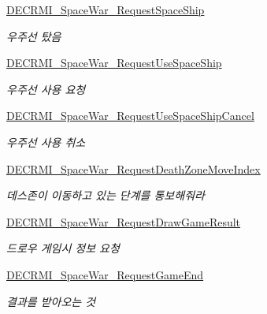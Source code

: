 \begin{DoxyCompactItemize}
\hyperlink{class_server_a34537516b59c805045c37d7b2b506c7d}{D\+E\+C\+R\+M\+I\+\_\+\+Space\+War\+\_\+\+Request\+Space\+Ship}
\begin{DoxyCompactList}\small\item\em 우주선 탔음 \end{DoxyCompactList}\item 
\hyperlink{class_server_a45bae018963433523b8c5a3843706297}{D\+E\+C\+R\+M\+I\+\_\+\+Space\+War\+\_\+\+Request\+Use\+Space\+Ship}
\begin{DoxyCompactList}\small\item\em 우주선 사용 요청 \end{DoxyCompactList}\item 
\hyperlink{class_server_ae212b680809a0791c9085ece9937ad3e}{D\+E\+C\+R\+M\+I\+\_\+\+Space\+War\+\_\+\+Request\+Use\+Space\+Ship\+Cancel}
\begin{DoxyCompactList}\small\item\em 우주선 사용 취소 \end{DoxyCompactList}\item 
\hyperlink{class_server_a127995f5512990fad6cc1f560c5357bc}{D\+E\+C\+R\+M\+I\+\_\+\+Space\+War\+\_\+\+Request\+Death\+Zone\+Move\+Index}
\begin{DoxyCompactList}\small\item\em 데스존이 이동하고 있는 단계를 통보해줘라 \end{DoxyCompactList}\item 
\hyperlink{class_server_ac7dacd8ba98cf0990b1f4a5c87560ae0}{D\+E\+C\+R\+M\+I\+\_\+\+Space\+War\+\_\+\+Request\+Draw\+Game\+Result}
\begin{DoxyCompactList}\small\item\em 드로우 게임시 정보 요청 \end{DoxyCompactList}\item 
\hyperlink{class_server_a9ab43800fb0165b193d60b89760a2d40}{D\+E\+C\+R\+M\+I\+\_\+\+Space\+War\+\_\+\+Request\+Game\+End}
\begin{DoxyCompactList}\small\item\em 결과를 받아오는 것 \end{DoxyCompactList}\end{DoxyCompactItemize}
